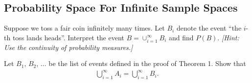 	\subsection{Probability Space For Infinite Sample Spaces}
	
	\begin{problem}
	Suppose we toss a fair coin infinitely many times. Let $B_i$ denote the event ``the $i$-th toss lands heads''. Interpret the event $B = \cup_{i = 1}^\infty B_i$ and find $P (B)$. \textit{[Hint: Use the continuity of probability measures.]}
	\end{problem}

	\begin{problem} %
	Let $B_1$, $B_2$, $\ldots$ be the list of events defined in the proof of Theorem 1. Show that
	\begin{align*}
	\bigcup_{i = 1}^\infty A_i = \bigcup_{i = 1}^\infty B_i .
	\end{align*}
	\end{problem}


